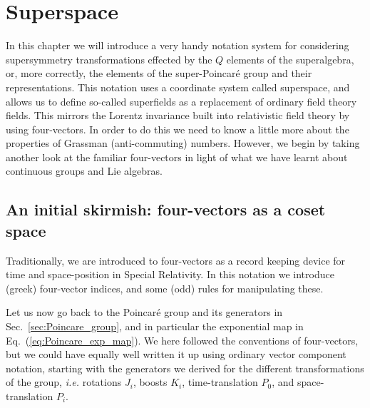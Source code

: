 \documentclass[notes.tex]{subfiles}
\begin{document}
\chapter{Superspace}
\label{chap:superspace}
In this chapter we will introduce a very handy notation system for considering supersymmetry transformations effected by the $Q$ elements of the superalgebra, or, more correctly, the elements of the super-Poincaré group and their representations. This notation uses a coordinate system called superspace, and allows us to define so-called superfields as a replacement of ordinary field theory fields. This mirrors the Lorentz invariance built into relativistic field theory by using four-vectors. In order to do this we need to know a little more about the properties of Grassman (anti-commuting) numbers. However, we begin by taking another look at the familiar four-vectors in light of what we have learnt about continuous groups and Lie algebras.


\section{An initial skirmish: four-vectors as a coset space}
\label{sec:four-vectors}
Traditionally, we are introduced to four-vectors as a record keeping device for time and space-position in Special Relativity. In this notation we introduce (greek) four-vector indices, and some (odd) rules for manipulating these. 

Let us now go back to the Poincaré group and its generators in Sec.~\ref{sec:Poincare_group}, and in particular the exponential map in Eq.~(\ref{eq:Poincare_exp_map}). We here followed the conventions of four-vectors, but we could have equally well written it up using ordinary vector component notation, starting with the generators we derived for the different transformations of the group, {\it i.e.} rotations $J_i$, boosts $K_i$, time-translation $P_0$, and space-translation $P_i$. 
\end{document}
